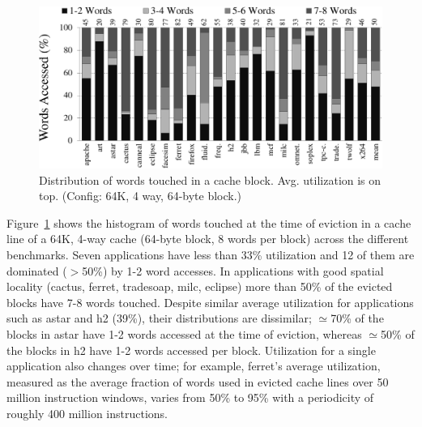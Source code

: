 
\begin{figure}[!h]

 \centering
  \includegraphics[width=\textwidth]{files/Plots/05-StackBar_Word_Access_64K.pdf}
  \caption[Distribution of words touched]{Distribution of words touched in a cache
    block. Avg. utilization is on top. (Config:
    64K, 4 way, 64-byte block.)}
  \label{fig:stackbar_words_64k}
\end{figure}

Figure~\ref{fig:stackbar_words_64k} shows the histogram of words touched at
the time of eviction in a cache line of a 64K, 4-way cache  (64-byte block, 8
words per block) across the different benchmarks.  Seven applications have
less than 33\% utilization and 12 of them are dominated ($>$50\%) by 1-2 word
accesses.  In applications with good spatial locality (cactus, ferret,
tradesoap, milc, eclipse) more than 50\% of the evicted blocks have 7-8 words
touched. Despite similar average utilization for applications such as astar
and h2 (39\%), their distributions are dissimilar; $\simeq$70\% of the blocks
in astar have 1-2 words accessed at the time of eviction,  whereas
$\simeq$50\% of the blocks in h2 have 1-2 words accessed per block.
Utilization for a single application also changes over time; for example,
ferret's  average utilization, measured as the average fraction of words used
in  evicted cache lines over 50 million instruction windows,  varies from 50\%
to 95\% with a periodicity of roughly 400 million instructions.


